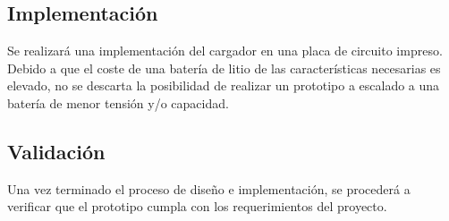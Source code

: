\subsection{Implementación}
Se realizará una implementación del cargador en una placa de circuito impreso.
Debido a que el coste de una batería de litio de las características necesarias es elevado,
no se descarta la posibilidad de realizar un prototipo a escalado a una batería de menor tensión y/o capacidad.

\subsection{Validación}
Una vez terminado el proceso de diseño e implementación,
se procederá a verificar que el prototipo cumpla con los requerimientos del proyecto.







